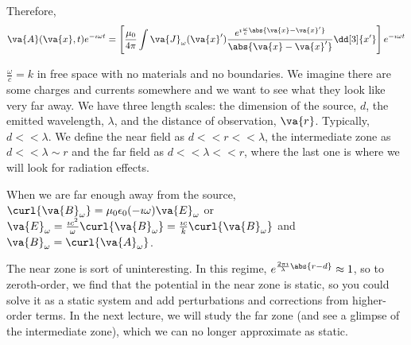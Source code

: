 \documentclass[a4paper,twoside,master.tex]{subfiles}
\begin{document}
Therefore,
\begin{equation}
    \va{A}( \va{x},t) e^{- \imath \omega t}  = \left[ \frac{\mu_0}{4 \pi} \int \va{J}_{\omega}( \va{x}') \frac{e^{\imath \frac{\omega}{c} \abs{ \va{x} - \va{x}'}}}{\abs{ \va{x} - \va{x}'}} \dd[3]{x'}\right] e^{- \imath \omega t}
\end{equation}

$ \frac{\omega}{c} = k $ in free space with no materials and no boundaries. We imagine there are some charges and currents somewhere and we want to see what they look like very far away. We have three length scales: the dimension of the source, $ d $, the emitted wavelength, $ \lambda $, and the distance of observation, $ \va{r} $. Typically, $ d << \lambda $. We define the near field as $ d << r << \lambda $, the intermediate zone as $ d << \lambda \sim r $ and the far field as $ d << \lambda << r $, where the last one is where we will look for radiation effects.

When we are far enough away from the source, $ \curl{ \va{B}_{\omega}} = \mu_0 \epsilon_0 (- \imath \omega) \va{E}_{\omega} $ or $ \va{E}_{\omega} = \frac{\imath c^2}{\omega} \curl{ \va{B}_{\omega}} = \frac{\imath c}{k} \curl{ \va{B}_{\omega}} $ and $ \va{B}_{\omega} = \curl{ \va{A}_{\omega}} $.

The near zone is sort of uninteresting. In this regime, $ e^{\frac{2 \pi \imath}{\lambda} \abs{r - d}} \approx 1 $, so to zeroth-order, we find that the potential in the near zone is static, so you could solve it as a static system and add perturbations and corrections from higher-order terms. In the next lecture, we will study the far zone (and see a glimpse of the intermediate zone), which we can no longer approximate as static.
\end{document}
